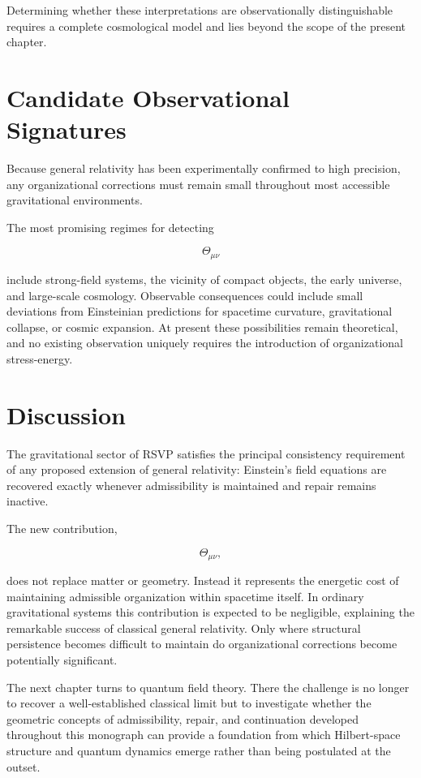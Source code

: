 \documentclass[11pt,oneside]{book}
\numberwithin{equation}{chapter}
\theoremstyle{definition}
\theoremstyle{plain}
\begin{document}
Determining whether these interpretations are observationally
distinguishable requires a complete cosmological model and lies beyond the
scope of the present chapter.

\section{Candidate Observational Signatures}

Because general relativity has been experimentally confirmed to high
precision, any organizational corrections must remain small throughout most
accessible gravitational environments.

The most promising regimes for detecting

\[
\Theta_{\mu\nu}
\]

include strong-field systems, the vicinity of compact objects, the early universe, and large-scale cosmology. Observable consequences could include small deviations from Einsteinian predictions for spacetime curvature, gravitational collapse, or cosmic expansion. At present these possibilities remain theoretical, and no existing observation uniquely requires the introduction of organizational stress-energy.

\section{Discussion}

The gravitational sector of RSVP satisfies the principal consistency
requirement of any proposed extension of general relativity: Einstein's
field equations are recovered exactly whenever admissibility is maintained
and repair remains inactive.

The new contribution,

\[
\Theta_{\mu\nu},
\]

does not replace matter or geometry. Instead it represents the energetic
cost of maintaining admissible organization within spacetime itself. In
ordinary gravitational systems this contribution is expected to be
negligible, explaining the remarkable success of classical general
relativity. Only where structural persistence becomes difficult to maintain
do organizational corrections become potentially significant.

The next chapter turns to quantum field theory. There the challenge is no
longer to recover a well-established classical limit but to investigate
whether the geometric concepts of admissibility, repair, and continuation
developed throughout this monograph can provide a foundation from which
Hilbert-space structure and quantum dynamics emerge rather than being
postulated at the outset.
\end{document}
